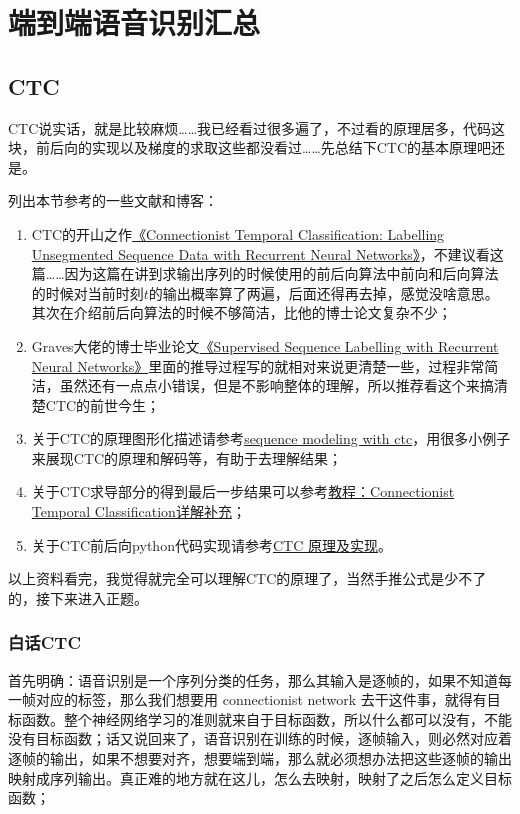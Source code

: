 \chapter{端到端语音识别汇总}
\section{CTC}
\label{sec:ctc}
CTC说实话，就是比较麻烦……我已经看过很多遍了，不过看的原理居多，代码这块，前后向的实现以及梯度的求取这些都没看过……先总结下CTC的基本原理吧还是。

列出本节参考的一些文献和博客：
\begin{enumerate}
  \item CTC的开山之作\href{http://www.cs.toronto.edu/~graves/icml_2006.pdf}{《Connectionist Temporal Classification: Labelling Unsegmented Sequence Data with Recurrent Neural Networks》}，不建议看这篇……因为这篇在讲到求输出序列的时候使用的前后向算法中前向和后向算法的时候对当前时刻$t$的输出概率算了两遍，后面还得再去掉，感觉没啥意思。其次在介绍前后向算法的时候不够简洁，比他的博士论文复杂不少；
  \item Graves大佬的博士毕业论文\href{https://www.cs.toronto.edu/~graves/preprint.pdf}{《Supervised Sequence Labelling with Recurrent Neural Networks》}里面的推导过程写的就相对来说更清楚一些，过程非常简洁，虽然还有一点点小错误，但是不影响整体的理解，所以推荐看这个来搞清楚CTC的前世今生；
  \item 关于CTC的原理图形化描述请参考\href{https://distill.pub/2017/ctc/}{sequence modeling with ctc}，用很多小例子来展现CTC的原理和解码等，有助于去理解结果；
  \item 关于CTC求导部分的得到最后一步结果可以参考\href{https://blog.csdn.net/w5688414/article/details/77867786}{教程：Connectionist Temporal Classification详解补充}；
  \item 关于CTC前后向python代码实现请参考\href{https://blog.csdn.net/JackyTintin/article/details/79425866}{CTC 原理及实现}。
\end{enumerate}

以上资料看完，我觉得就完全可以理解CTC的原理了，当然手推公式是少不了的，接下来进入正题。
\subsection{白话CTC}
首先明确：语音识别是一个序列分类的任务，那么其输入是逐帧的，如果不知道每一帧对应的标签，那么我们想要用 connectionist network 去干这件事，就得有目标函数。整个神经网络学习的准则就来自于目标函数，所以什么都可以没有，不能没有目标函数；话又说回来了，语音识别在训练的时候，逐帧输入，则必然对应着逐帧的输出，如果不想要对齐，想要端到端，那么就必须想办法把这些逐帧的输出映射成序列输出。真正难的地方就在这儿，怎么去映射，映射了之后怎么定义目标函数；


